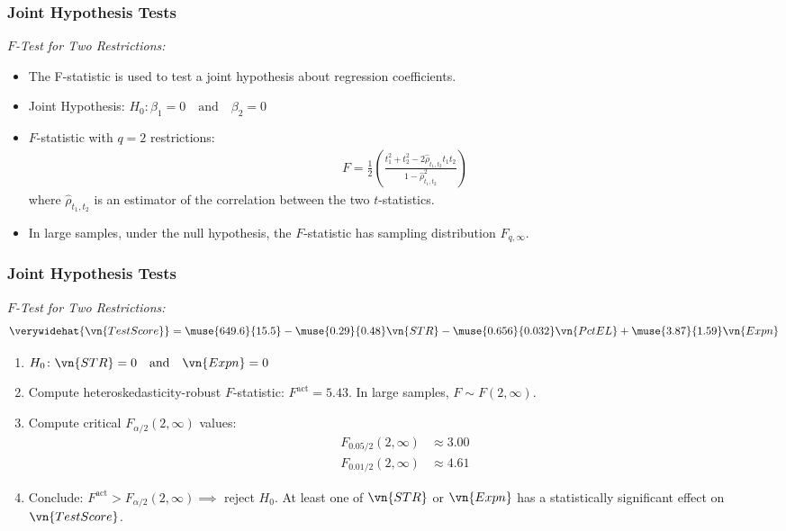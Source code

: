 

\begin{frame}
\frametitle{Joint Hypothesis Tests}
\emph{$F$-Test for Two Restrictions:}
\begin{itemize}
\item The F-statistic is used to test a joint hypothesis about regression coefficients. 
\item Joint Hypothesis:
\quad $H_{0}\colon \beta_{1}=0 \quad \text{and} \quad \beta_{2}=0$
\item $F$-statistic with $q=2$ restrictions:
\begin{align*}
F = \frac{1}{2}\left(\frac{t_{1}^{2}+t_{2}^{2}-2\hat{\rho}_{t_{1},t_{2}} t_{1}t_{2}}{1-\hat{\rho}_{t_{1},t_{2}}^{2}}\right)
\end{align*}
where $\hat{\rho}_{t_{1},t_{2}}$ is an estimator of the correlation between the two $t$-statistics.
\item In large samples, under the null hypothesis, the $F$-statistic has sampling distribution $F_{q,\infty}$.
\end{itemize}
\end{frame}


\begin{frame}
\frametitle{Joint Hypothesis Tests}
\emph{$F$-Test for Two Restrictions:}
\begin{align*}
\verywidehat{\vn{TestScore}}
  = \muse{649.6}{15.5} - \muse{0.29}{0.48}   \vn{STR}
                       - \muse{0.656}{0.032} \vn{PctEL}
                       + \muse{3.87}{1.59}   \vn{Expn}
\end{align*}
\begin{enumerate}
\item $H_{0}\colon \vn{STR}=0 \quad \text{and} \quad \vn{Expn}=0$
\item Compute heteroskedasticity-robust $F$-statistic:
\quad $F^{\text{act}}=5.43$. 
\newlinequad
In large samples, $F \sim F(2,\infty)$.
\item Compute critical $F_{\alpha/2}(2,\infty)$ values:
\begin{align*}
F_{0.05/2}(2,\infty) & \approx 3.00 \\
F_{0.01/2}(2,\infty) & \approx 4.61 
\end{align*}
\item Conclude: 
\quad $F^{\text{act}}>F_{\alpha/2}(2,\infty)\implies$ reject $H_{0}$. 
\newline
At least one of $\vn{STR}$ or $\vn{Expn}$ has a statistically significant effect on $\vn{TestScore}$.
\end{enumerate}
\end{frame}

